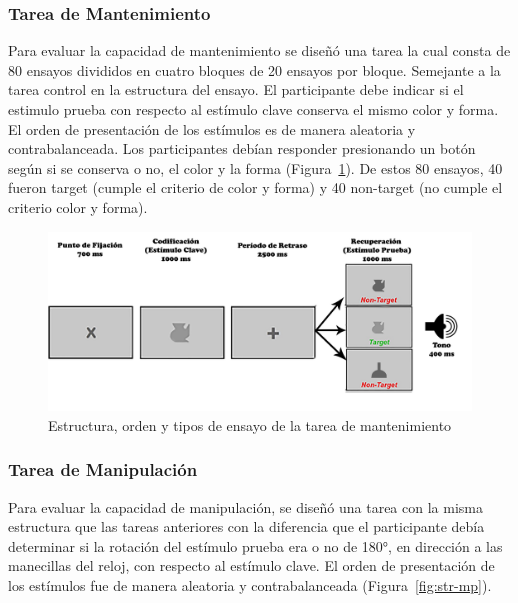 \documentclass[12pt,letterpaper,final]{article}
\begin{document}
\subsubsection{Tarea de Mantenimiento}
Para evaluar la capacidad de mantenimiento se diseñó una tarea la cual consta de 80 ensayos divididos en cuatro bloques de 20 ensayos por bloque.  Semejante a la tarea control en la estructura del ensayo. El participante   debe indicar si el estimulo prueba con respecto al estímulo clave conserva el mismo color y forma. El orden de presentación de los estímulos es de manera aleatoria y contrabalanceada.
Los participantes debían responder presionando un botón según si se conserva o no, el color y la forma (Figura~\ref{fig:str-mt}).
De estos 80 ensayos, 40 fueron target (cumple el criterio de color y forma) y 40 non-target (no cumple el criterio color y forma). %

\begin{figure}[h]
	\centering
	\includegraphics[scale=0.35]{str-mt.png}
	\caption{Estructura, orden y tipos de ensayo de la tarea de mantenimiento}
	\label{fig:str-mt}
\end{figure}

\subsubsection{Tarea de Manipulación}
Para evaluar la capacidad de manipulación, se diseñó una tarea con la misma estructura que las tareas anteriores con la diferencia que el participante debía determinar si la rotación del estímulo prueba era o no de \ang{180}, en dirección a las manecillas del reloj, con respecto al estímulo clave. El orden de presentación de los estímulos fue de manera aleatoria y contrabalanceada (Figura~\ref{fig:str-mp}). 
\end{document}
